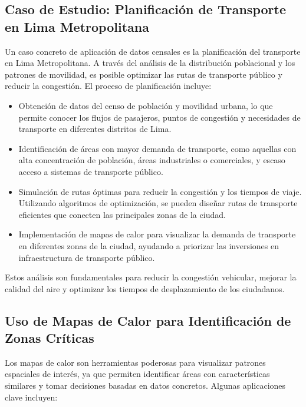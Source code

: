 \documentclass{article}
\begin{document}
{\subsection*{Caso de Estudio: Planificación de Transporte en Lima Metropolitana}
Un caso concreto de aplicación de datos censales es la planificación del transporte en Lima Metropolitana. A través del análisis de la distribución poblacional y los patrones de movilidad, es posible optimizar las rutas de transporte público y reducir la congestión. El proceso de planificación incluye:

\begin{itemize}
	\item Obtención de datos del censo de población y movilidad urbana, lo que permite conocer los flujos de pasajeros, puntos de congestión y necesidades de transporte en diferentes distritos de Lima.
	\item Identificación de áreas con mayor demanda de transporte, como aquellas con alta concentración de población, áreas industriales o comerciales, y escaso acceso a sistemas de transporte público.
	\item Simulación de rutas óptimas para reducir la congestión y los tiempos de viaje. Utilizando algoritmos de optimización, se pueden diseñar rutas de transporte eficientes que conecten las principales zonas de la ciudad.
	\item Implementación de mapas de calor para visualizar la demanda de transporte en diferentes zonas de la ciudad, ayudando a priorizar las inversiones en infraestructura de transporte público.
\end{itemize}

Estos análisis son fundamentales para reducir la congestión vehicular, mejorar la calidad del aire y optimizar los tiempos de desplazamiento de los ciudadanos.

\subsection*{Uso de Mapas de Calor para Identificación de Zonas Críticas}
Los mapas de calor son herramientas poderosas para visualizar patrones espaciales de interés, ya que permiten identificar áreas con características similares y tomar decisiones basadas en datos concretos. Algunas aplicaciones clave incluyen:

}
\end{document}
